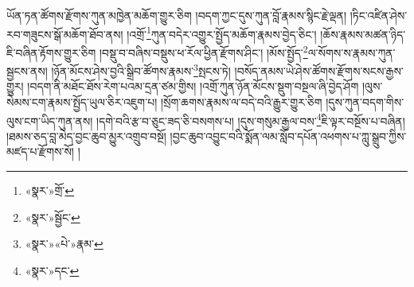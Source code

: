 ཡོན་ཏན་ཚོགས་རྫོགས་ཀུན་མཁྱེན་མཆོག་གྱུར་ཅིག །བདག་ཀྱང་དུས་ཀུན་བློ་རྣམས་སྙིང་རྗེ་ལྡན། །ཏིང་འཛིན་ཤེས་རབ་གཟུངས་སྒོ་མཆོག་ཐོབ་ནས། །འགྲོ་\footnote{«སྣར་»གྲོ་}ཀུན་བདེར་འགྱུར་སྤྱོད་མཆོག་རྣམས་བྱེད་ཅིང་། །ཆོས་རྣམས་མཚན་ཉིད་ཇི་བཞིན་རྟོགས་གྱུར་ཅིག །བསྡུ་བ་བཞིས་བསྡུས་ཕ་རོལ་ཕྱིན་རྫོགས་ཤིང་། །མོས་སྤྱོད་\footnote{«སྣར་»སྦྱོང་}ལ་སོགས་ས་རྣམས་ཀུན་སྦྱངས་ནས། །ཉོན་མོངས་ཤེས་བྱའི་སྒྲིབ་ཚོགས་རྣམས་\footnote{«སྣར་»«པེ་»རྣམ་}སྤངས་ཏེ། །བསོད་ནམས་ཡེ་ཤེས་ཚོགས་རྫོགས་སངས་རྒྱས་གྱུར། །བདག་ནི་མཐོང་ཐོས་རེག་པའམ་དྲན་ཙམ་གྱིས། །འགྲོ་ཀུན་ཉོན་མོངས་སྡུག་བསྔལ་ཞི་བྱེད་ཤོག །ལུས་སེམས་ངག་རྣམས་སྤྱོད་ཡུལ་ཅིར་འཇུག་པ། །སྲོག་ཆགས་རྣམས་ལ་བདེ་བའི་རྒྱུར་གྱུར་ཅིག །དུས་ཀུན་བདག་གིས་ལུས་ངག་ཡིད་ཀུན་ནས། །དགེ་བའི་རྩ་བ་ཅུང་ཟད་ཅི་བསགས་པ། །དུས་གསུམ་རྒྱལ་བས་\footnote{«སྣར་»དང་}ཇི་ལྟར་བསྔོས་པ་བཞིན། །ཐམས་ཅད་བླ་མེད་བྱང་ཆུབ་མྱུར་འགྲུབ་བསྔོ། །བྱང་ཆུབ་འབྱུང་བའི་སྨོན་ལམ་སློབ་དཔོན་འཕགས་པ་ཀླུ་སྒྲུབ་ཀྱིས་མཛད་པ་རྫོགས་སོ། །